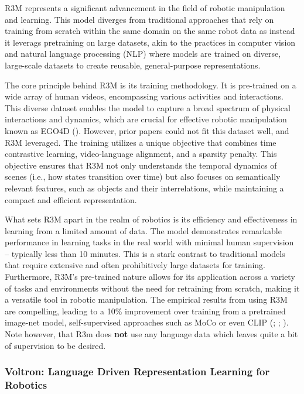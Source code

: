 \documentclass[
  letterpaper,
  numbers=noenddot,
  DIV=11]{scrreprt}
\theoremstyle{definition}
\theoremstyle{plain}
\theoremstyle{plain}
\theoremstyle{remark}
\begin{document}
R3M represents a significant advancement in the field of robotic
manipulation and learning. This model diverges from traditional
approaches that rely on training from scratch within the same domain on
the same robot data as instead it leverags pretraining on large
datasets, akin to the practices in computer vision and natural language
processing (NLP) where models are trained on diverse, large-scale
datasets to create reusable, general-purpose representations.

The core principle behind R3M is its training methodology. It is
pre-trained on a wide array of human videos, encompassing various
activities and interactions. This diverse dataset enables the model to
capture a broad spectrum of physical interactions and dynamics, which
are crucial for effective robotic manipulation known as EGO4D
(). However, prior
papers could not fit this dataset well, and R3M leveraged. The training
utilizes a unique objective that combines time contrastive learning,
video-language alignment, and a sparsity penalty. This objective ensures
that R3M not only understands the temporal dynamics of scenes (i.e., how
states transition over time) but also focuses on semantically relevant
features, such as objects and their interrelations, while maintaining a
compact and efficient representation.

What sets R3M apart in the realm of robotics is its efficiency and
effectiveness in learning from a limited amount of data. The model
demonstrates remarkable performance in learning tasks in the real world
with minimal human supervision -- typically less than 10 minutes. This
is a stark contrast to traditional models that require extensive and
often prohibitively large datasets for training. Furthermore, R3M's
pre-trained nature allows for its application across a variety of tasks
and environments without the need for retraining from scratch, making it
a versatile tool in robotic manipulation. The empirical results from
using R3M are compelling, leading to a 10\% improvement over training
from a pretrained image-net model, self-supervised approaches such as
MoCo or even CLIP (;
;
). Note however,
that R3m does \textbf{not} use any language data which leaves quite a
bit of supervision to be desired.

\subsubsection*{Voltron: Language Driven Representation Learning for
Robotics}\label{voltron-language-driven-representation-learning-for-robotics}
\end{document}
